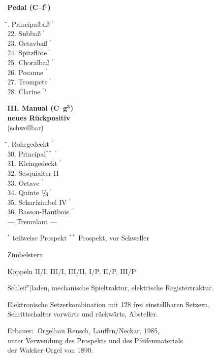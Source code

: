 \documentclass[a4paper,12pt,parskip=half]{scrartcl}
\newcommand{\Fuss}{$^\prime$}
\newcommand{\bruch}[2]{$\raisebox{2pt}{\footnotesize#1}\hspace{-2pt}/\hspace{-1.5pt}\raisebox{-2pt}{\footnotesize#2}$}
\newcommand{\ed}{\bruch{1}{3}$\,$}
\begin{document}
\begin{minipage}[t]{.45\textwidth}
{\bfseries Pedal (C--f$^{\mathbf1}$)}
\begin{tabbing}
\hspace{5cm}\= . Principalbaß \Fuss\' \\
22. Subbaß \Fuss\' \\
23. Octavbaß \Fuss\' \\
24. Spitzflöte \Fuss\' \\
25. Choralbaß \Fuss\' \\
26. Posaune \Fuss\' \\
27. Trompete \Fuss\' \\
28. Clarine \Fuss\'
\end{tabbing}

\vspace{\baselineskip}

{\bfseries III. Manual (C--g$^{\mathbf3}$)} \\
\phantom{\bfseries III.} {\bfseries neues Rückpositiv} \\
\phantom{\bfseries III.} (schwellbar)
\begin{tabbing}
\hspace{5cm}\= . Rohrgedeckt \Fuss\' \\
30. Principal$^{**}$ \Fuss\' \\
31. Kleingedeckt \Fuss\' \\
32. Sesquialter II \\
33. Octave \Fuss\' \\
34. Quinte  \ed\Fuss\' \\
35. Scharfzimbel IV \Fuss\' \\
36. Basson-Hautbois \Fuss\' \\
--- Tremulant ---
\end{tabbing}
\end{minipage}

\medskip

{\footnotesize
\hspace{57mm}
$^*$ teilweise Prospekt
\hspace{5mm}
$^{**}$ Prospekt, vor Schweller
}

\vfill

Zimbelstern

\smallskip

Koppeln   II/I, III/I, III/II, I/P, II/P, III/P

\smallskip

Schleif"|laden, mechanische Spieltraktur, elektrische Registertraktur.

\smallskip

Elektronische Setzerkombination mit 128 frei einstellbaren Setzern, \\
Schrittschalter vorwärts und rückwärts, Absteller.

\vfill

\begin{tabbing}
Erbauer: $\:$\=Orgelbau Rensch, Lauffen/Neckar, 1985, \\
 \>unter Verwendung des Prospekts und des Pfeifenmaterials \\
 \>der Walcker-Orgel von 1890.
\end{tabbing}
\end{document}

